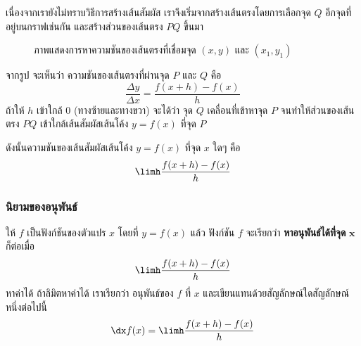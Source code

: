 \begin{frame}
เนื่องจากเรายังไม่ทราบวิธีการสร้างเส้นสัมผัส เราจึงเริ่มจากสร้างเส้นตรงโดยการเลือกจุด $Q$ อีกจุดที่อยู่บนกราฟเช่นกัน และสร้างส่วนของเส้นตรง $PQ$ ขึ้นมา

\begin{figure}[h!]
\centering
{}
\caption{ภาพแสดงการหาความชันของเส้นตรงที่เชื่อมจุด $(x,y)$ และ $(x_1,y_1)$}
\end{figure}
\end{frame}

\begin{frame}
\begin{slide}
จากรูป จะเห็นว่า ความชันของเส้นตรงที่ผ่านจุด $P$ และ $Q$  คือ
\[ \frac{\Delta y}{\Delta x} = \frac{f(x+h) - f(x)}{h}\]   
ถ้าให้  $h$ เข้าใกล้ 0 (ทางซ้ายและทางขวา) จะได้ว่า จุด $Q$  เคลื่อนที่เข้าหาจุด $P$  จนทำให้ส่วนของเส้นตรง $PQ$  เข้าใกล้เส้นสัมผัสเส้นโค้ง $y=f(x)$ ที่จุด $P$ 
\medskip 

ดังนั้นความชันของเส้นสัมผัสเส้นโค้ง  $y=f(x)$ ที่จุด $x$  ใดๆ คือ
\[ \limh \frac{f(x+h) - f(x)}{h}\]
\end{slide}
\end{frame}


\begin{frame}
\frametitle{นิยามของอนุพันธ์}
\begin{defn}{}{}
ให้  $f$ เป็นฟังก์ชันของตัวแปร $x$ โดยที่ $y = f(x)$ แล้ว ฟังก์ชัน $f$ จะเรียกว่า \textbf{หาอนุพันธ์ได้ที่จุด} $\mathbf{x}$  ก็ต่อเมื่อ    
\begin{equation}
\limh \frac{f(x+h) - f(x)}{h}
\end{equation}
หาค่าได้ \pa ถ้าลิมิตหาค่าได้ เราเรียกว่า อนุพันธ์ของ $f$  ที่ $x$  และเขียนแทนด้วยสัญลักษณ์ใดสัญลักษณ์หนึ่งต่อไปนี้
\[ \dx f(x) = \limh \frac{f(x+h) - f(x)}{h}\]
\end{defn}
\end{frame}


